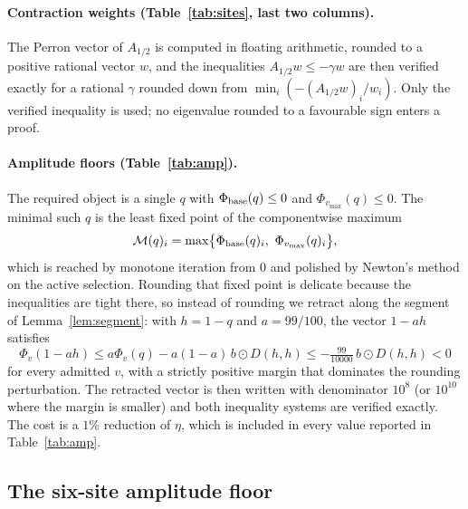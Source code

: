 \paragraph{Contraction weights (Table~\ref{tab:sites}, last two columns).}
The Perron vector of $A_{1/2}$ is computed in floating arithmetic, rounded to a
positive rational vector $w$, and the inequalities $A_{1/2}w\le-\gamma w$ are
then verified exactly for a rational $\gamma$ rounded down from
$\min_i(-(A_{1/2}w)_i/w_i)$. Only the verified inequality is used;
no eigenvalue rounded to a favourable sign enters a proof.

\paragraph{Amplitude floors (Table~\ref{tab:amp}).}
The required object is a single $q$ with $\Phi_{\mathrm{base}}(q)\le0$ and
$\Phi_{v_{\max}}(q)\le0$. The minimal such $q$ is the least fixed point of the
componentwise maximum
\[
 \mathcal M(q)_i=\max\bigl\{\PhiB(q)_i,\ \Phi_{v_{\max}}(q)_i\bigr\},
\]
which is reached by monotone iteration from $0$ and polished by Newton's method
on the active selection. Rounding that fixed point is delicate because the
inequalities are tight there, so instead of rounding we retract along the
segment of Lemma~\ref{lem:segment}: with $h=1-q$ and $a=99/100$, the vector
$1-ah$ satisfies
\[
 \Phi_v(1-ah)\le a\Phi_v(q)-a(1-a)\,b\odot D(h,h)\le-\tfrac{99}{10000}\,b\odot D(h,h)<0
\]
for every admitted $v$, with a strictly positive margin that dominates the
rounding perturbation. The retracted vector is then written with denominator
$10^8$ (or $10^{10}$ where the margin is smaller) and both inequality systems
are verified exactly. The cost is a $1\%$ reduction of $\eta$, which is included
in every value reported in Table~\ref{tab:amp}.

\subsection{The six-site amplitude floor}


